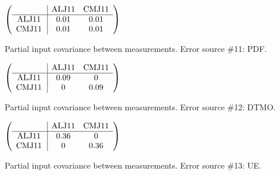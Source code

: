 \begin{table}[H]
\scriptsize
\begin{center}
\renewcommand{\arraystretch}{1.1}
\begin{math}\left(\begin{array}{c|cc}
 & \mathrm{ALJ11} & 
\mathrm{CMJ11} \\
\hline
\mathrm{ALJ11} \hspace*{2pt} &       0.01 &       0.01 \\
\mathrm{CMJ11} \hspace*{2pt} &       0.01 &       0.01 \\
\end{array}\right)\end{math}
\caption{Partial input covariance between measurements. Error source \#11: PDF.}
\renewcommand{\arraystretch}{1}
\end{center}
\end{table}
\begin{table}[H]
\scriptsize
\begin{center}
\renewcommand{\arraystretch}{1.1}
\begin{math}\left(\begin{array}{c|cc}
 & \mathrm{ALJ11} & 
\mathrm{CMJ11} \\
\hline
\mathrm{ALJ11} \hspace*{2pt} &       0.09 &  0 \\
\mathrm{CMJ11} \hspace*{2pt} &  0 &       0.09 \\
\end{array}\right)\end{math}
\caption{Partial input covariance between measurements. Error source \#12: DTMO.}
\renewcommand{\arraystretch}{1}
\end{center}
\end{table}
\begin{table}[H]
\scriptsize
\begin{center}
\renewcommand{\arraystretch}{1.1}
\begin{math}\left(\begin{array}{c|cc}
 & \mathrm{ALJ11} & 
\mathrm{CMJ11} \\
\hline
\mathrm{ALJ11} \hspace*{2pt} &       0.36 &  0 \\
\mathrm{CMJ11} \hspace*{2pt} &  0 &       0.36 \\
\end{array}\right)\end{math}
\caption{Partial input covariance between measurements. Error source \#13: UE.}
\renewcommand{\arraystretch}{1}
\end{center}
\end{table}
